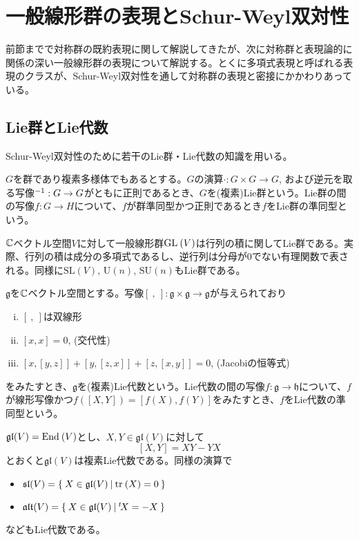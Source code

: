 \documentclass{ltjsreport}
\begin{document}
\section{一般線形群の表現とSchur-Weyl双対性}

前節までで対称群の既約表現に関して解説してきたが、次に対称群と表現論的に関係の深い一般線形群の表現について解説する。とくに多項式表現と呼ばれる表現のクラスが、Schur-Weyl双対性を通して対称群の表現と密接にかかわりあっている。



\subsection{Lie群とLie代数}
Schur-Weyl双対性のために若干のLie群・Lie代数の知識を用いる。

\begin{defin}[Lie群]
  $G$を群であり複素多様体でもあるとする。$G$の演算$\cdot:G\times G\rightarrow G$, および逆元を取る写像$^{-1}:G\rightarrow G$がともに正則であるとき、$G$を(複素)Lie群という。Lie群の間の写像$f:G\rightarrow H$について、$f$が群準同型かつ正則であるとき$f$をLie群の準同型という。
\end{defin}

\begin{eg}
  $\mathbb{C}$ベクトル空間$V$に対して一般線形群$\text{GL}\:(V)$は行列の積に関してLie群である。実際、行列の積は成分の多項式であるし、逆行列は分母が$0$でない有理関数で表される。同様に$\text{SL}(V)$, $\text{U}(n)$, $\text{SU}(n)$もLie群である。
\end{eg}

\begin{defin}[Lie代数]
  $\mathfrak{g}$を$\mathbb{C}$ベクトル空間とする。写像$[\:,\:]:\mathfrak{g}\times \mathfrak{g}\rightarrow \mathfrak{g}$が与えられており
  \begin{enumerate}[(i)]
    \item $[\:,\:]$は双線形
    \item $[x,x]=0$, (交代性)
    \item $[x,[y,z]]+[y,[z,x]]+[z,[x,y]]=0$, (Jacobiの恒等式)
  \end{enumerate}
  をみたすとき、$\mathfrak{g}$を(複素)Lie代数という。Lie代数の間の写像$f:\mathfrak{g}\rightarrow \mathfrak{h}$について、$f$が線形写像かつ$f([X,Y])=[f(X),f(Y)]$をみたすとき、$f$をLie代数の準同型という。
\end{defin}

\begin{eg}
  $\mathfrak{gl}(V)=\text{End}\:(V)$とし、$X,Y\in\mathfrak{gl}(V)$に対して
  \[
  [X,Y]=XY-YX  
  \]
  とおくと$\mathfrak{gl}(V)$は複素Lie代数である。同様の演算で
  \begin{itemize}
    \item $\mathfrak{sl}(V)=\left\{\:X\in\mathfrak{gl}(V)\:\middle|\:\text{tr}\:(X)=0\:\right\}$
    \item $\mathfrak{alt}(V)=\left\{\:X\in\mathfrak{gl}(V)\:\middle|\:^t\!X=-X\:\right\}$
  \end{itemize}
  などもLie代数である。
\end{eg}
\end{document}
